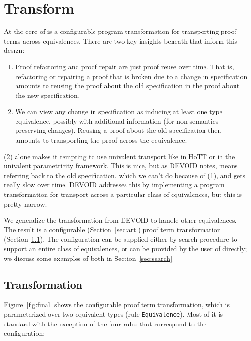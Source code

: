 \section{Transform}
\label{sec:meat}

At the core of \toolname is a configurable program transformation for transporting proof terms across equivalences.
There are two key insights beneath \toolname that inform this design:

\begin{enumerate}
\item Proof refactoring and proof repair are just proof reuse over time. That is, refactoring or repairing
a proof that is broken due to a change in specification amounts to reusing the proof about the old specification
in the proof about the new specification.
\item We can view any change in specification as inducing at least one type equivalence,
possibly with additional information (for non-semantics-preserving changes).
Reusing a proof about the old specification then amounts to transporting the proof across the equivalence.
\end{enumerate}
(2) alone makes it tempting to use univalent transport like in HoTT or in the univalent parametricity framework.
This is nice, but as DEVOID notes, means referring back to the old specification, which we can't do because of (1),
and gets really slow over time. %
DEVOID addresses this by implementing a program transformation for transport across a particular class of equivalences,
but this is pretty narrow.

We generalize the transformation from DEVOID to handle other equivalences.
The result is a configurable (Section~\ref{sec:art}) proof term transformation (Section~\ref{sec:transform}).
The configuration can be supplied either by search procedure to support an entire class of equivalences,
or can be provided by the user of \toolname directly;
we discuss some examples of both in Section~\ref{sec:search}.

\subsection{Transformation}
\label{sec:transform}

Figure~\ref{fig:final} shows the configurable proof term transformation,
which is parameterized over two equivalent types (rule \lstinline{Equivalence}).
Most of it is standard with the exception of the four rules that correspond to the configuration:

